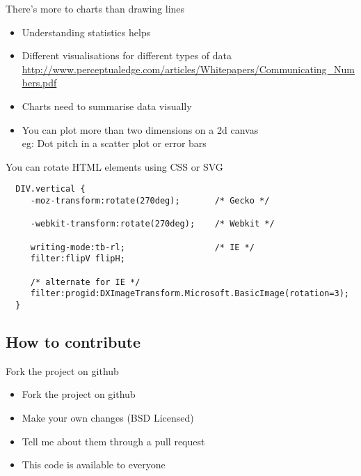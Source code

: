 \documentclass{beamer}
\begin{document}
\begin{frame}{There's more to charts than drawing lines}
  \begin{itemize}
  \item Understanding statistics helps
  \item Different visualisations for different types of data \\ \href{http://www.perceptualedge.com/articles/Whitepapers/Communicating\_Numbers.pdf}{\tiny{http://www.perceptualedge.com/articles/Whitepapers/Communicating\_Numbers.pdf}}
  \item Charts need to summarise data visually
  \item You can plot more than two dimensions on a 2d canvas \\ \tiny{eg: Dot pitch in a scatter plot or error bars}
  \end{itemize}
\end{frame}

\begin{frame}[fragile]{You can rotate HTML elements using CSS or SVG}
  \begin{block}{}
  \tiny{\begin{verbatim}
  DIV.vertical {
     -moz-transform:rotate(270deg);       /* Gecko */

     -webkit-transform:rotate(270deg);    /* Webkit */

     writing-mode:tb-rl;                  /* IE */
     filter:flipV flipH;

     /* alternate for IE */
     filter:progid:DXImageTransform.Microsoft.BasicImage(rotation=3);
  }
  \end{verbatim}}
  \end{block}
\end{frame}

\subsection{How to contribute}

\begin{frame}{Fork the project on github}
  \begin{itemize}
  \item Fork the project on github
  \item Make your own changes (BSD Licensed)
  \item Tell me about them through a pull request
  \item This code is available to everyone
  \end{itemize}
  \begin{block}{}
  \begin{center}
  \end{center}
  \end{block}
\end{frame}
\end{document}
